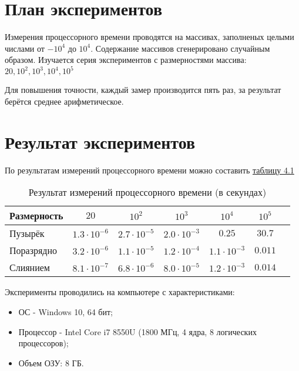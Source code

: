 \section*{План экспериментов}
Измерения процессорного времени проводятся на массивах, заполненых целыми числами от $ -10^{4} $ до $ 10^{4} $. Содержание массивов сгенерировано случайным образом. Изучается серия экспериментов с размерностями массива: $20, 10^{2}, 10^{3}, 10^{4}, 10^{5}$

Для повышения точности, каждый замер производится пять раз, за результат берётся среднее арифметическое.

\section*{Результат экспериментов}
По результатам измерений процессорного времени можно составить \hyperref[table_4_1]{таблицу 4.1}

\begin{table}[h] \label{table_4_1}
\caption{Результат измерений процессорного времени (в секундах)}
\begin{tabular}{| p{3.0cm} | c | c | c | c | c | c |}
	\hline
	Размерность		&$20$				&$10^{2}$			&$10^{3}$			&$10^{4}$			&$10^{5}$\\
	\hline\hline
	Пузырёк			&$1.3\cdot10^{-6}$	&$2.7\cdot10^{-5}$	&$2.0\cdot10^{-3}$	&$0.25$				&$30.7$	\\
	\hline
	Поразрядно		&$3.2\cdot10^{-6}$	&$1.1\cdot10^{-5}$	&$1.2\cdot10^{-4}$	&$1.1\cdot10^{-3}$	&$0.011$\\
	\hline
	Слиянием		&$8.1\cdot10^{-7}$	&$6.8\cdot10^{-6}$	&$8.0\cdot10^{-5}$	&$1.2\cdot10^{-3}$	&$0.014$\\
	\hline
\end{tabular}
\end{table}


Эксперименты проводились на компьютере с характеристиками:
\begin{itemize}
	\item ОС - Windows 10, 64 бит;
	\item Процессор -  Intel Core i7 8550U (1800 МГц, 4 ядра, 8 логических процессоров);
	\item Объем ОЗУ: 8 ГБ.
\end{itemize}

